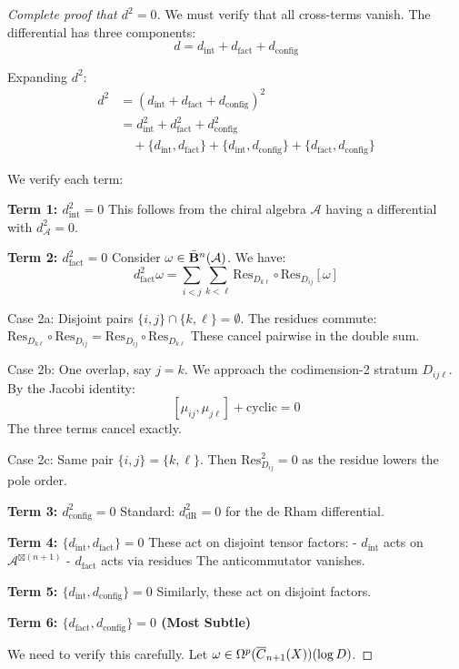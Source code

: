 \begin{proof}[Complete proof that $d^2 = 0$]
We must verify that all cross-terms vanish. The differential has three components:
$$d = d_{\text{int}} + d_{\text{fact}} + d_{\text{config}}$$

Expanding $d^2$:
\begin{align}
d^2 &= (d_{\text{int}} + d_{\text{fact}} + d_{\text{config}})^2 \\
&= d_{\text{int}}^2 + d_{\text{fact}}^2 + d_{\text{config}}^2 \\
&\quad + \{d_{\text{int}}, d_{\text{fact}}\} + \{d_{\text{int}}, d_{\text{config}}\} + \{d_{\text{fact}}, d_{\text{config}}\}
\end{align}

We verify each term:

\textbf{Term 1: $d_{\text{int}}^2 = 0$}
This follows from the chiral algebra $\mathcal{A}$ having a differential with $d_{\mathcal{A}}^2 = 0$.

\textbf{Term 2: $d_{\text{fact}}^2 = 0$}
Consider $\omega \in \bar{\mathbf{B}}^n(\mathcal{A})$. We have:
$$d_{\text{fact}}^2\omega = \sum_{i<j} \sum_{k<\ell} \text{Res}_{D_{k\ell}} \circ \text{Res}_{D_{ij}}[\omega]$$

Case 2a: Disjoint pairs $\{i,j\} \cap \{k,\ell\} = \emptyset$.
The residues commute: $\text{Res}_{D_{k\ell}} \circ \text{Res}_{D_{ij}} = \text{Res}_{D_{ij}} \circ \text{Res}_{D_{k\ell}}$
These cancel pairwise in the double sum.

Case 2b: One overlap, say $j = k$.
We approach the codimension-2 stratum $D_{ij\ell}$. By the Jacobi identity:
$$[\mu_{ij}, \mu_{j\ell}] + \text{cyclic} = 0$$
The three terms cancel exactly.

Case 2c: Same pair $\{i,j\} = \{k,\ell\}$.
Then $\text{Res}_{D_{ij}}^2 = 0$ as the residue lowers the pole order.

\textbf{Term 3: $d_{\text{config}}^2 = 0$}
Standard: $d_{\text{dR}}^2 = 0$ for the de Rham differential.

\textbf{Term 4: $\{d_{\text{int}}, d_{\text{fact}}\} = 0$}
These act on disjoint tensor factors:
- $d_{\text{int}}$ acts on $\mathcal{A}^{\boxtimes(n+1)}$
- $d_{\text{fact}}$ acts via residues
The anticommutator vanishes.

\textbf{Term 5: $\{d_{\text{int}}, d_{\text{config}}\} = 0$}
Similarly, these act on disjoint factors.

\textbf{Term 6: $\{d_{\text{fact}}, d_{\text{config}}\} = 0$ (Most Subtle)}

We need to verify this carefully. Let $\omega \in \Omega^p(\overline{C}_{n+1}(X))(\log D)$.


\end{proof}
